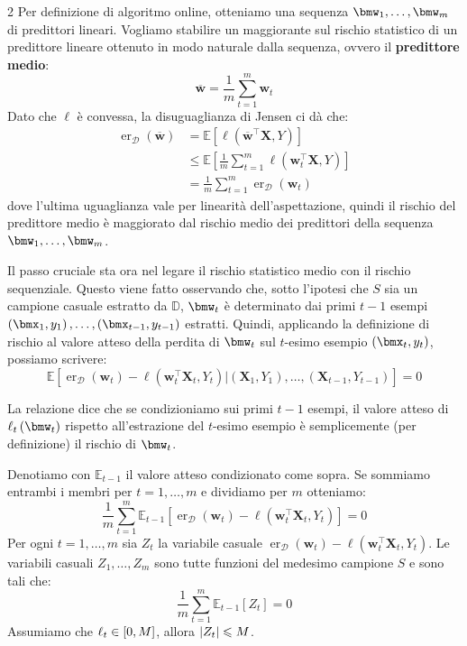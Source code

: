 \documentclass[\main/main.tex]{subfiles}
\begin{document}
\begin{analysis}
\begin{multicols}{2}
        Per definizione di algoritmo online, otteniamo una sequenza \(\bmw_1, \ldots, \bmw_m\) di predittori lineari. Vogliamo stabilire un maggiorante sul rischio statistico di un predittore lineare ottenuto in modo naturale dalla sequenza, ovvero il \textbf{predittore medio}:
        \[\overline{\boldsymbol{w}}=\frac{1}{m} \sum_{t=1}^{m} \boldsymbol{w}_{t}\]
        Dato che \(\ell\) è convessa, la disuguaglianza di Jensen ci dà che:
        \begin{align*}
            \operatorname{er}_{\mathcal{D}}(\overline{\boldsymbol{w}})&=\mathbb{E}\left[\ell\left(\overline{\boldsymbol{w}}^{\top} \boldsymbol{X}, Y\right)\right] \\&\leq \mathbb{E}\left[\frac{1}{m} \sum_{t=1}^{m} \ell\left(\boldsymbol{w}_{t}^{\top} \boldsymbol{X}, Y\right)\right]\\&=\frac{1}{m} \sum_{t=1}^{m} \operatorname{er}_{\mathcal{D}}\left(\boldsymbol{w}_{t}\right)
        \end{align*}
        dove l'ultima uguaglianza vale per linearità dell'aspettazione, quindi il rischio del predittore medio è maggiorato dal rischio medio dei predittori della sequenza \(\bmw_1, \ldots, \bmw_m\).
        
        Il passo cruciale sta ora nel legare il rischio statistico medio con il rischio sequenziale. Questo viene fatto osservando che, sotto l'ipotesi che \(S\) sia un campione casuale estratto da \(\mathbb{D}\), \(\bmw_t\) è determinato dai primi \(t-1\) esempi \(\rnd{\bmx_1, y_1}, \ldots, \rnd{\bmx_{t-1}, y_{t-1}}\) estratti. Quindi, applicando la definizione di rischio al valore atteso della perdita di \(\bmw_t\) sul \(t\)-esimo esempio \(\rnd{\bmx_t, y_t}\), possiamo scrivere:
        \[\mathbb{E}\left[\operatorname{er}_{\mathcal{D}}\left(\boldsymbol{w}_{t}\right)-\ell\left(\boldsymbol{w}_{t}^{\top} \boldsymbol{X}_{t}, Y_{t}\right) |\left(\boldsymbol{X}_{1}, Y_{1}\right), \ldots,\left(\boldsymbol{X}_{t-1}, Y_{t-1}\right)\right]=0\]
        
        La relazione dice che se condizioniamo sui primi \(t-1\) esempi, il valore atteso di \(\ell_t\rnd{\bmw_t}\) rispetto all'estrazione del \(t\)-esimo esempio è semplicemente (per definizione) il rischio di \(\bmw_t\).
        
        Denotiamo con \(\mathbb{E}_{t-1}\) il valore atteso condizionato come sopra. Se sommiamo entrambi i membri per \(t=1, \ldots, m\) e dividiamo per \(m\) otteniamo:
        \[\frac{1}{m} \sum_{t=1}^{m} \mathbb{E}_{t-1}\left[\operatorname{er}_{\mathcal{D}}\left(\boldsymbol{w}_{t}\right)-\ell\left(\boldsymbol{w}_{t}^{\top} \boldsymbol{X}_{t}, Y_{t}\right)\right]=0\]
        Per ogni \(t=1,\ldots,m\) sia \(Z_t\) la variabile casuale \(\operatorname{er}_{\mathcal{D}}\left(\boldsymbol{w}_{t}\right)-\ell\left(\boldsymbol{w}_{t}^{\top} \boldsymbol{X}_{t}, Y_{t}\right)\). Le variabili casuali \(Z_1, \ldots, Z_m\) sono tutte funzioni del medesimo campione \(S\) e sono tali che:
        \[\frac{1}{m} \sum_{t=1}^{m} \mathbb{E}_{t-1}\left[Z_{t}\right]=0\]
        Assumiamo che \(\ell_t \in \left[0,M\right]\), allora \(\left\lvert Z_t\right\rvert \leqslant M\).
        

\end{multicols}
\end{analysis}
\end{document}
